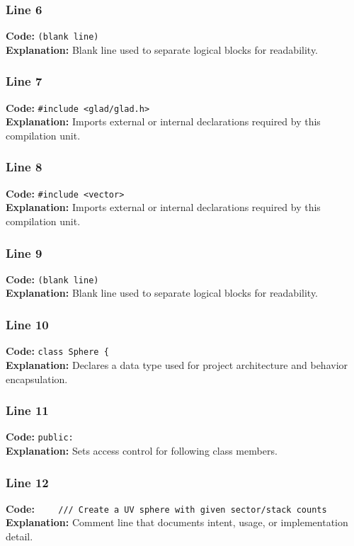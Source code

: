 \documentclass[11pt,a4paper]{article}
\begin{document}
\subsubsection*{Line 6}
\textbf{Code:} \texttt{(blank line)}\\
\textbf{Explanation:} Blank line used to separate logical blocks for readability.

\subsubsection*{Line 7}
\textbf{Code:} \verb|#include <glad/glad.h>|\\
\textbf{Explanation:} Imports external or internal declarations required by this compilation unit.

\subsubsection*{Line 8}
\textbf{Code:} \verb|#include <vector>|\\
\textbf{Explanation:} Imports external or internal declarations required by this compilation unit.

\subsubsection*{Line 9}
\textbf{Code:} \texttt{(blank line)}\\
\textbf{Explanation:} Blank line used to separate logical blocks for readability.

\subsubsection*{Line 10}
\textbf{Code:} \verb|class Sphere {|\\
\textbf{Explanation:} Declares a data type used for project architecture and behavior encapsulation.

\subsubsection*{Line 11}
\textbf{Code:} \verb|public:|\\
\textbf{Explanation:} Sets access control for following class members.

\subsubsection*{Line 12}
\textbf{Code:} \verb|    /// Create a UV sphere with given sector/stack counts|\\
\textbf{Explanation:} Comment line that documents intent, usage, or implementation detail.
\end{document}
